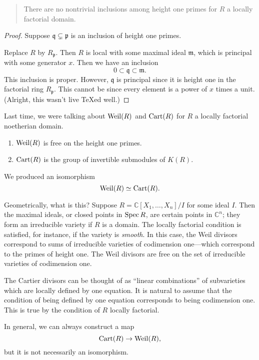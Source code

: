 \begin{quote}
There are no nontrivial inclusions among height one primes for $R$ a locally
factorial domain. 
\end{quote}

\begin{proof}  Suppose $\mathfrak{q} \subsetneq \mathfrak{p}$ is an inclusion
of height one primes. 

Replace $R$ by $R_{\mathfrak{p}}$. Then $R$ is local with some maximal ideal
$\mathfrak{m}$, which is principal with some generator $x$.  
Then we have an inclusion 
\[ 0 \subset \mathfrak{q} \subset \mathfrak{m}.  \]
This inclusion is proper. However, $\mathfrak{q}$ is principal since
it is height one in the factorial ring $R_{\mathfrak{p}}$.
This cannot be since every element is a power of $x$ times a unit.
(Alright, this wasn't live \TeX ed well.)
\end{proof} 

Last time, we were talking about $\operatorname{Weil}(R)$ and $\operatorname{Cart}(R)$ for $R$ a locally
factorial noetherian domain.
\begin{enumerate}
\item $\operatorname{Weil}(R)$ is free on the height one primes. 
\item $\operatorname{Cart}(R)$ is the group of invertible submodules of $K(R)$.
\end{enumerate}
We produced an isomorphism
\[ \operatorname{Weil}(R) \simeq \operatorname{Cart}(R).  \]

\begin{remark} 
Geometrically, what is this? Suppose $R = \mathbb{C}[X_1, \dots, X_n]/I$ for
some ideal $I$. Then the maximal ideals, or closed points in $\operatorname{Spec} R$, are
certain points in $\mathbb{C}^n$; they form an irreducible variety if $R$ is
a domain. The locally factorial condition is satisfied, for instance, if the
variety is \emph{smooth}. In this case, the Weil divisors correspond to sums of 
irreducible varieties of codimension one---which correspond to the primes of
height one. The Weil divisors are free on the set
of irreducible varieties of codimension one.  

The Cartier divisors can be thought of as ``linear combinations'' of
subvarieties which are locally defined by one equation. It is natural to assume
that the condition of being defined by one equation corresponds to being
codimension one. This is true by the condition of $R$ locally factorial.

In general, we can always construct a map
\[ \operatorname{Cart}(R) \to \operatorname{Weil}(R),  \]
but it is not necessarily an isomorphism. 


\end{remark} 

